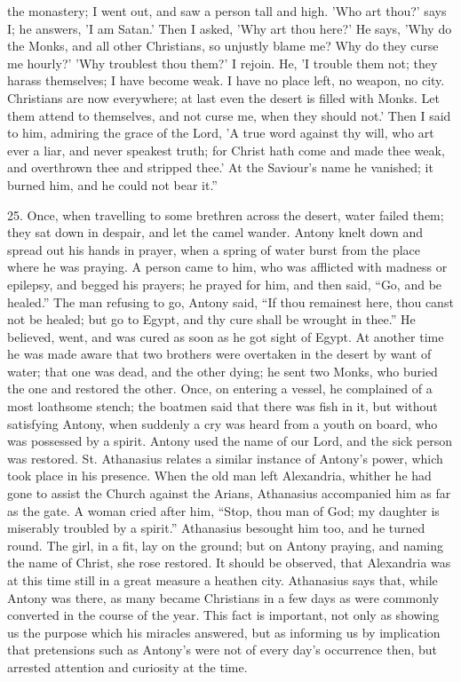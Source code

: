 the monastery; I went out, and saw a person tall and high. 'Who art
thou?' says I; he answers, 'I am Satan.' Then I asked, 'Why art thou
here?' He says, 'Why do the Monks, and all other Christians, so
unjustly blame me? Why do they curse me hourly?' 'Why troublest thou
them?' I rejoin. He, 'I trouble them not; they harass themselves; I
have become weak. I have no place left, no weapon, no city. Christians
are now everywhere; at last even the desert is filled with Monks. Let
them attend to themselves, and not curse me, when they should not.'
Then I said to him, admiring the grace of the Lord, 'A true word
against thy will, who art ever a liar, and never speakest truth; for
Christ hath come and made thee weak, and overthrown thee and stripped
thee.' At the Saviour's name he vanished; it burned him, and he could
not bear it.''

25.
Once, when travelling to some brethren across the desert, water failed
them; they sat down in despair, and let the camel wander. Antony knelt
down and spread out his hands in prayer, when a spring of water burst
from the place where he was praying. A person came to him, who
was afflicted with madness or epilepsy, and begged his prayers; he
prayed for him, and then said, ``Go, and be healed.'' The man refusing
to go, Antony said, ``If thou remainest here, thou canst not be healed;
but go to Egypt, and thy cure shall be wrought in thee.'' He believed,
went, and was cured as soon as he got sight of Egypt. At another time
he was made aware that two brothers were overtaken in the desert by
want of water; that one was dead, and the other dying; he sent two
Monks, who buried the one and restored the other. Once, on entering a
vessel, he complained of a most loathsome stench; the boatmen said
that there was fish in it, but without satisfying Antony, when
suddenly a cry was heard from a youth on board, who was possessed by a
spirit. Antony used the name of our Lord, and the sick person was
restored. St. Athanasius relates a similar instance of Antony's power,
which took place in his presence. When the old man left Alexandria,
whither he had gone to assist the Church against the Arians,
Athanasius accompanied him as far as the gate. A woman cried after
him, ``Stop, thou man of God; my daughter is miserably troubled by a
spirit.'' Athanasius besought him too, and he turned round. The girl,
in a fit, lay on the ground; but on Antony praying, and naming the
name of Christ, she rose restored. It should be observed, that
Alexandria was at this time still in a great measure a heathen
city. Athanasius says that, while Antony was there, as many became
Christians in a few days as were commonly converted in the course of
the year. This fact is important, not only as showing us the purpose
which his miracles answered, but as informing us by implication that
pretensions such as Antony's were not of every day's occurrence then,
but arrested attention and curiosity at the time.

